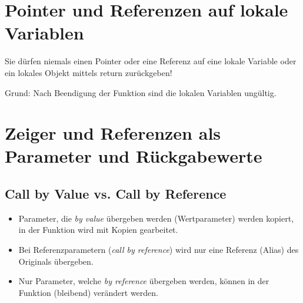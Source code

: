 \section{Pointer und Referenzen auf lokale Variablen}
\begin{achtung}
Sie dürfen niemals einen Pointer oder eine Referenz auf eine lokale Variable oder ein lokales Objekt mittels return zurückgeben!
\end{achtung}
Grund: Nach Beendigung der Funktion sind die lokalen Variablen ungültig.

\section{Zeiger und Referenzen als Parameter und Rückgabewerte}

\subsection{Call by Value vs. Call by Reference}
\begin{itemize}
	\item Parameter, die \emph{by value} übergeben werden (Wertparameter) werden kopiert, in der Funktion wird mit Kopien gearbeitet.
	\item Bei Referenzparametern (\emph{call by reference}) wird nur eine Referenz (Alias) des Originals übergeben.
	\item Nur Parameter, welche \emph{by reference} übergeben werden, können in der Funktion (bleibend) verändert werden.
\end{itemize}

